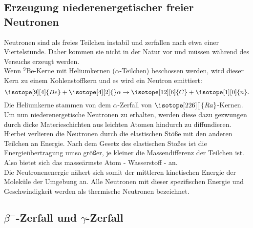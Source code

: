 \subsection{Erzeugung niederenergetischer freier Neutronen}
Neutronen sind als freies Teilchen instabil und zerfallen nach etwa einer Viertelstunde. Daher kommen sie nicht in der Natur vor und müssen
während des Versuchs erzeugt werden.\\
Wenn $^9 \mathrm{Be}$-Kerne mit Heliumkernen ($\alpha$-Teilchen) beschossen werden, wird dieser Kern zu einem Kohlenstoffkern und es wird
ein Neutron emittiert:
\begin{equation*}
    \isotope[9][4]{Be} + \isotope[4][2]{} \alpha \to \isotope[12][6]{C} + \isotope[1][0]{n}.
\end{equation*}
Die Heliumkerne stammen von dem $\alpha$-Zerfall von $\isotope[226][]{Ra}$-Kernen.\\
Um nun niederenergetische Neutronen zu erhalten, werden diese dazu gezwungen durch dicke Materieschichten aus leichten Atomen hindurch zu diffundieren. 
Hierbei verlieren die Neutronen durch die elastischen Stöße mit den anderen Teilchen an Energie. Nach dem Gesetz des elastischen
Stoßes ist die Energieübertragung umso größer, je kleiner die Massendifferenz der Teilchen ist. Also bietet sich das masseärmste
Atom - Wasserstoff - an.\\
Die Neutronenenergie nähert sich somit der mittleren kinetischen Energie der Moleküle der Umgebung an. Alle Neutronen mit dieser
spezifischen Energie und Geschwindigkeit werden als thermische Neutronen bezeichnet.\\

\subsection{\texorpdfstring{$\beta^-$}{Beta}-Zerfall und \texorpdfstring{$\gamma$}{Gamma}-Zerfall}

